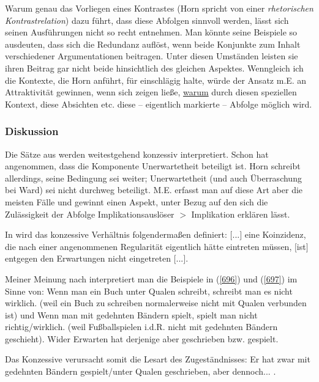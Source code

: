 Warum genau das Vorliegen eines Kontrastes (Horn spricht von einer \textit{rhetori\-schen Kontrastrelation})  dazu führt, dass diese Abfolgen sinnvoll werden, lässt sich seinen Ausführungen nicht so recht entnehmen. Man könnte seine Beispiele so ausdeuten, dass sich die Redundanz auflöst, wenn beide Konjunkte zum Inhalt verschiedener Argumentationen beitragen. Unter diesen Umständen leisten sie ihren Beitrag gar nicht beide hinsichtlich des gleichen Aspektes. Wenngleich ich die Kontexte, die Horn anführt, für einschlägig halte, würde der Ansatz m.E. an Attraktivität gewinnen, wenn sich zeigen ließe, \underline{warum} durch diesen speziellen Kontext, diese Absichten etc. diese – eigentlich markierte – Abfolge möglich wird.

\subsubsection{Diskussion}
\label{sec:disk}
Die Sätze aus \citet{Horn1991} werden weitestgehend konzessiv interpretiert. Schon \citet[227-232]{Ward1985} hat angenommen, dass die Komponente \glq Unerwartet\-heit\grq {} beteiligt ist. Horn schreibt allerdings, seine Bedingung sei weiter; Unerwartet\-heit (und auch  \glq Überraschung\grq {} bei Ward) sei nicht durchweg beteiligt. M.E. erfasst man auf diese Art aber die meisten Fälle und gewinnt einen Aspekt, unter Bezug auf den sich die Zulässigkeit der Abfolge Implikationsauslöser $>$ Implikation er\-klären lässt.

In \citet[2293]{Zifonun1997} wird das konzessive Verhältnis folgendermaßen definiert: \glqq $[$...$]$ eine Koinzidenz, die nach einer angenommenen Regularität eigentlich hätte eintreten müssen, $[$ist$]$ entgegen den Erwartungen nicht eingetreten $[$...$]$\grqq{}.

Meiner Meinung nach interpretiert man die Beispiele in (\ref{696}) und (\ref{697}) im Sinne von: \glq Wenn man ein Buch unter Qualen schreibt, schreibt man es nicht wirklich.\grq {} (weil ein Buch zu schreiben normalerweise nicht mit Qualen verbunden ist) und \glq Wenn man mit gedehnten Bändern spielt, spielt man nicht richtig/wirklich.\grq {} (weil Fußballspielen i.d.R. nicht mit gedehnten Bändern geschieht). Wider Erwarten hat derjenige aber geschrieben bzw. gespielt.

Das Konzessive verursacht somit die Lesart des Zugeständnisses: \glq Er hat zwar mit gedehnten Bändern gespielt/unter Qualen geschrieben, aber dennoch...\grq {} . 

